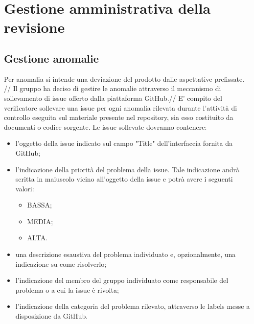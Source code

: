 \section{Gestione amministrativa della revisione}
	\subsection{Gestione anomalie}
		Per anomalia si intende una deviazione del prodotto dalle aspettative prefissate. //
		Il gruppo ha deciso di gestire le anomalie attraverso il meccanismo di sollevamento di issue offerto dalla piattaforma GitHub.//
		E' compito del verificatore sollevare una issue per ogni anomalia rilevata durante l'attività di controllo eseguita sul materiale presente nel repository, sia esso costituito da documenti o codice sorgente.
		Le issue sollevate dovranno contenere:
		\begin{itemize}
			\item l'oggetto della issue indicato sul campo "Title" dell'interfaccia fornita da GitHub;
			\item l'indicazione della priorità del problema della issue. Tale indicazione andrà scritta in maiuscolo vicino all'oggetto della issue e potrà avere i seguenti valori:
				\begin{itemize}
					\item BASSA;
					\item MEDIA;
					\item ALTA.
				\end{itemize}
			\item una descrizione esaustiva del problema individuato e, opzionalmente, una indicazione su come risolverlo;
			\item l'indicazione del membro del gruppo \groupname individuato come responsabile del problema o a cui la issue è rivolta;
			\item l'indicazione della categoria del problema rilevato, attraverso le labels messe a disposizione da GitHub.
		\end{itemize}